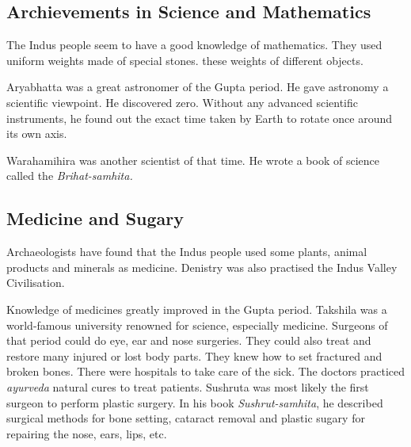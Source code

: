 \subsection{Archievements in Science and Mathematics}
The Indus people seem to have a good knowledge of mathematics. They used uniform weights made of special stones. these weights of different objects.
\vspace{0.1in}
\par
Aryabhatta was a great astronomer of the Gupta period. He gave astronomy a scientific viewpoint. He discovered zero. Without any advanced scientific instruments, he found out the exact time taken by Earth to rotate once around its own axis.
\vspace{0.1in}
\par
Warahamihira was another scientist of that time. He wrote a book of science called the \textit{Brihat-samhita.}
\vspace{0.4in}
\subsection{Medicine and Sugary}
Archaeologists have found that the Indus people used some plants, animal products and minerals as medicine. Denistry was also practised the Indus Valley Civilisation.
\vspace{0.1in}
\par
Knowledge of medicines greatly improved in the Gupta period. Takshila was a world-famous university renowned for science, especially medicine. Surgeons of that period could do eye, ear and nose surgeries. They could also treat and restore many injured or lost body parts. They knew how to set fractured and broken bones. There were hospitals to take care of the sick.
\vspace{0.1in}
The doctors practiced \textit{ayurveda} natural cures to treat patients. Sushruta was most likely the first surgeon to perform plastic surgery. In his book \textit{Sushrut-samhita}, he described surgical methods for bone setting, cataract removal and plastic sugary for repairing the nose, ears, lips, etc.

